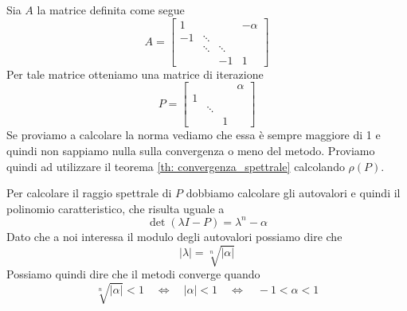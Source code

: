 \begin{example}
	Sia $A$ la matrice definita come segue
	\[
		A = \begin{bmatrix}
			1  &        &        & -\alpha \\
			-1 & \ddots &        &         \\
			   & \ddots & \ddots &         \\
			   &        & -1     & 1
		\end{bmatrix}
	\]
	Per tale matrice otteniamo una matrice di iterazione
	\[
		P = \begin{bmatrix}
			  &        &   & \alpha \\
			1 &        &   &        \\
			  & \ddots &   &        \\
			  &        & 1 &
		\end{bmatrix}
	\]
	Se proviamo a calcolare la norma vediamo che essa è sempre maggiore di 1 e quindi non sappiamo nulla sulla
	convergenza o meno del metodo. Proviamo quindi ad utilizzare il teorema \ref{th: convergenza_spettrale}
	calcolando $\rho (P)$.

	Per calcolare il raggio spettrale di $P$ dobbiamo calcolare gli autovalori e quindi il polinomio
	caratteristico, che risulta uguale a
	\[ \det(\lambda I - P) = \lambda^n - \alpha \]
	Dato che a noi interessa il modulo degli autovalori possiamo dire che
	\[ |\lambda| = \sqrt[n]{|\alpha|} \]
	Possiamo quindi dire che il metodi converge quando
	\[
		\sqrt[n]{|\alpha|} < 1 \quad
		\Leftrightarrow \quad |\alpha| < 1 \quad
		\Leftrightarrow \quad -1 < \alpha < 1
	\]
\end{example}
